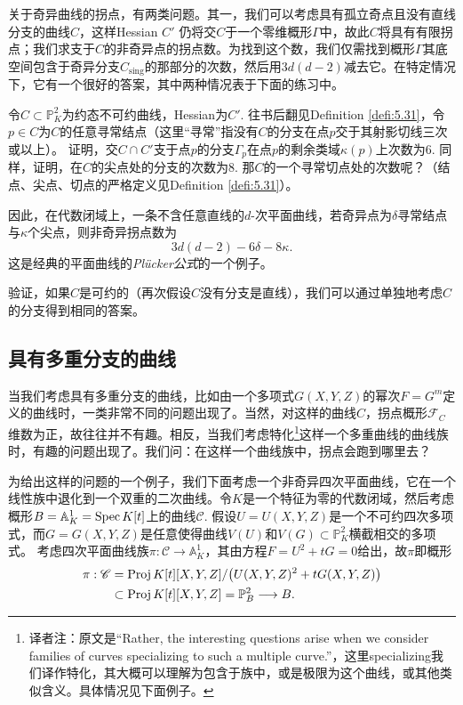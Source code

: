 
关于奇异曲线的拐点，有两类问题。其一，我们可以考虑具有孤立奇点且没有直线分支的曲线$C$，这样Hessian $C'$ 仍将交$C$于一个零维概形$\Gamma$中，故此$C$将具有有限拐点；我们求支于$C$的非奇异点的拐点数。为找到这个数，我们仅需找到概形$\Gamma$其底空间包含于奇异分支$C_{\text{sing}}$的那部分的次数，然后用$3d(d-2)$减去它。在特定情况下，它有一个很好的答案，其中两种情况表于下面的练习中。

\begin{exe}\label{exe:4.8}
	令$C\subset \mathbb P_K^2$为约态不可约曲线，Hessian为$C'$. 往书后翻见Definition \ref{defi:5.31}，令$p\in C$为$C$的任意寻常结点（这里“寻常”指没有$C$的分支在点$p$交于其射影切线三次或以上）。
	证明，交$C\cap C'$支于点$p$的分支$\Gamma_p$在点$p$的剩余类域$\kappa(p)$上次数为$6$. 同样，证明，在$C$的尖点处的分支的次数为$8$. 那$C$的一个寻常切点处的次数呢？（结点、尖点、切点的严格定义见Definition \ref{defi:5.31}）。
\end{exe}

因此，在代数闭域上，一条不含任意直线的$d$-次平面曲线，若奇异点为$\delta$寻常结点与$\kappa$个尖点，则非奇异拐点数为
\[
	3d(d-2)-6\delta -8\kappa.
\]
这是经典的平面曲线的\textit{Pl\"ucker公式}的一个例子。

\begin{exe}\label{exe:4.9}
	验证，如果$C$是可约的（再次假设$C$没有分支是直线），我们可以通过单独地考虑$C$的分支得到相同的答案。
\end{exe}

\subsection{具有多重分支的曲线}\label{s:4.1.3}

当我们考虑具有多重分支的曲线，比如由一个多项式$G(X,Y,Z)$的幂次$F=G^m$定义的曲线时，一类非常不同的问题出现了。当然，对这样的曲线$C$，拐点概形$\mathscr F_C$维数为正，故往往并不有趣。相反，当我们考虑特化\footnote{译者注：原文是``Rather, the interesting questions arise when we consider families of curves specializing to such a multiple curve.''，这里specializing我们译作特化，其大概可以理解为包含于族中，或是极限为这个曲线，或其他类似含义。具体情况见下面例子。}这样一个多重曲线的曲线族时，有趣的问题出现了。我们问：在这样一个曲线族中，拐点会跑到哪里去？

为给出这样的问题的一个例子，我们下面考虑一个非奇异四次平面曲线，它在一个线性族中退化到一个双重的二次曲线。令$K$是一个特征为零的代数闭域，然后考虑概形$B=\mathbb A_K^1=\operatorname{Spec} K[t]$上的曲线$\mathscr C$. 假设$U=U(X,Y,Z)$是一个不可约四次多项式，而$G=G(X,Y,Z)$是任意使得曲线$V(U)$和$V(G)\subset \mathbb P_K^2$横截相交的多项式。
考虑四次平面曲线族$\pi:\mathscr C\to \mathbb A_K^1$，其由方程$F=U^2+tG=0$给出，故$\pi$即概形
\[
	\begin{aligned}
	\pi:\mathscr C&=\operatorname{Proj} K[t][X,Y,Z]/\bigl(U(X,Y,Z)^2+tG(X,Y,Z)\bigr)\\
	&\subset \operatorname{Proj} K[t][X,Y,Z]=\mathbb P_B^2\longrightarrow B.
	\end{aligned}
\]

